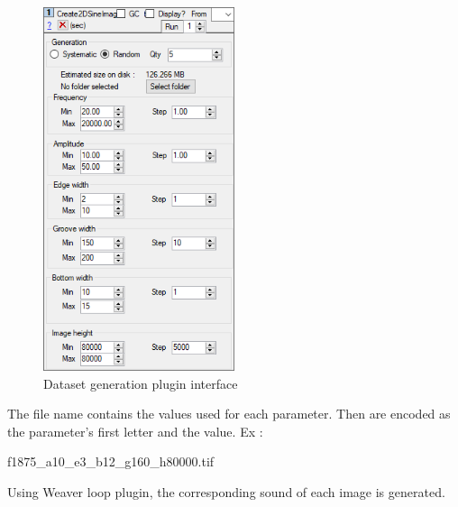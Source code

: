 \documentclass[12pt, twoside]{article}
\begin{document}
\begin{figure}
	\centering
	\includegraphics[width=0.5\textwidth]{../images/datasetplugin.png}
	\caption{Dataset generation plugin interface}
	\label{dsplugin}
\end{figure}

The file name contains the values used for each parameter. Then are encoded as the parameter's first letter and the value. Ex :

f1875\_a10\_e3\_b12\_g160\_h80000.tif

Using Weaver loop plugin, the corresponding sound of each image is generated.
\end{document}
